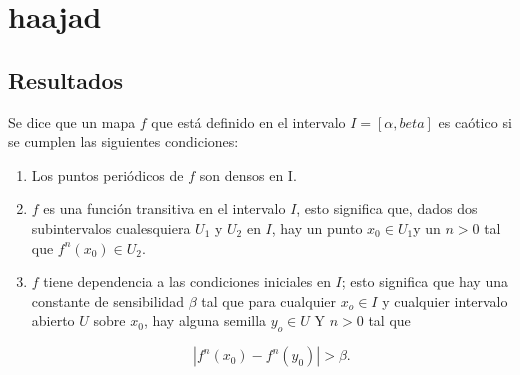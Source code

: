\chapter{haajad}
\section{Resultados}

Se dice que un mapa $f$ que está definido en el intervalo $I= [\alpha, beta]$ es caótico si se cumplen las siguientes condiciones:

\begin{enumerate}
\item Los puntos periódicos de $f$ son densos en I.
\item $f$ es una función transitiva en el intervalo $I$, esto significa que, dados dos subintervalos cualesquiera $U_{1}$ y $U_{2}$ en $I$, hay un punto $x_{0} \in U_{1}$y un $n>0$ tal que $f^{n}(x_{0}) \in U_{2}$.
\item $f$ tiene dependencia  a las condiciones iniciales en $I$; esto significa que hay una constante de sensibilidad $\beta$ tal que para cualquier $x_{o} \in I$ y cualquier intervalo abierto $U$ sobre $x_{0}$, hay alguna semilla $y_{o} \in U$ Y $n >0$ tal que

\begin{equation}
|f^{n}(x_{0}) - f^{n}(y_{0}) | > \beta.
\end{equation} 
\end{enumerate}